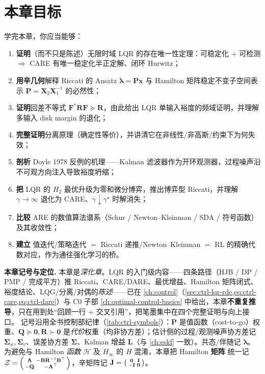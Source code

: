 \section*{本章目标}
学完本章，你应当能够：
\begin{enumerate}
  \item \textbf{证明}（而不只是陈述）无限时域 LQR 的存在唯一性定理：可稳定化 $+$ 可检测 $\Rightarrow$ CARE 有唯一稳定化半正定解、闭环 Hurwitz；
  \item \textbf{用辛几何}解释 Riccati 的 Ansatz $\boldsymbol\lambda=\mathbf P\mathbf x$ 与 Hamilton 矩阵稳定不变子空间表示 $\mathbf P=\mathbf X_2\mathbf X_1^{-1}$ 的必然性；
  \item \textbf{证明}回差不等式 $\mathbf F^*\mathbf R\mathbf F\succeq\mathbf R$，由此给出 LQR 单输入裕度的频域证明，并理解多输入 disk margin 的退化；
  \item \textbf{完整证明}分离原理（确定性等价），并讲清它在非线性/非高斯/约束下为何失效；
  \item \textbf{剖析} Doyle 1978 反例的机理——Kalman 滤波器作为开环观测器，过程噪声沿不可观方向注入导致裕度坍缩；
  \item \textbf{把} LQR 的 $H_2$ 最优升级为零和微分博弈，推出博弈型 Riccati，并理解 $\gamma\to\infty$ 退化为 CARE、$\gamma\downarrow\gamma^\star$ 时解消失；
  \item \textbf{比较} ARE 的数值算法谱系（Schur / Newton--Kleinman / SDA / 符号函数）及其收敛性；
  \item \textbf{建立} 值迭代/策略迭代 $=$ Riccati 递推/Newton--Kleinman $=$ RL 的精确代数对应，作为通往强化学习的桥。
\end{enumerate}

\begin{note}
\textbf{本章记号与定位.}\;
本章是\emph{深化章}。LQR 的入门级内容——四条路径（HJB / DP / PMP / 完成平方）推 Riccati、CARE/DARE、最优增益、Hamilton 矩阵闭式、裕度结论、LQG/分离/对偶的\emph{陈述}——已在 \cref{ch:control}（\cref{sec:ctrl-lqr-rde,eq:ctrl-care,eq:ctrl-dare}）与 C0 子部 \cref{ch:optimal-control-basics} 中给出，本章\textbf{不重复推导}，只在用到处“回顾一行 $+$ 交叉引用”，把笔墨集中在四个完整证明与向上接口。
记号沿用全书控制部纪律（\cref{tab:ctrl-symbols}）：$\mathbf P$ 是值函数（cost-to-go）权重、$\mathbf Q\succeq\mathbf0,\mathbf R\succ\mathbf0$ 是\emph{代价}权重（均非协方差）；估计侧的过程/观测噪声协方差记 $\boldsymbol\Sigma_w,\boldsymbol\Sigma_v$、误差协方差 $\boldsymbol\Sigma$、Kalman 增益 $\mathbf L$（与 \cref{ch:eskf} 一致）。共态/伴随记 $\boldsymbol\lambda$。
为避免与 Hamilton \emph{函数} $\mathcal H$ 及 $H_\infty$ 的 $H$ 混淆，本章把 Hamilton \textbf{矩阵} 统一记 $\mathcal Z=\begin{psmallmatrix}\mathbf A&-\mathbf B\mathbf R^{-1}\mathbf B^\top\\-\mathbf Q&-\mathbf A^\top\end{psmallmatrix}$，辛矩阵记 $\mathbf J=\begin{psmallmatrix}\mathbf0&\mathbf I\\-\mathbf I&\mathbf0\end{psmallmatrix}$。
\end{note}

